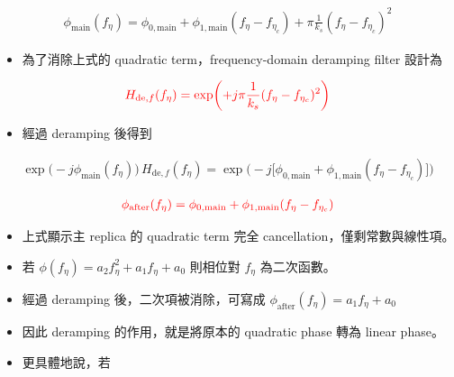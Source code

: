 \documentclass[10pt]{article}
\providecommand{\tightlist}{%
  \setlength{\itemsep}{0pt}\setlength{\parskip}{0pt}}
\begin{document}
\begin{equation}
\begin{aligned}
\phi_{\mathrm{main}}(f_\eta)=\phi_{0,\mathrm{main}}+\phi_{1,\mathrm{main}}(f_\eta-f_{\eta_c})+\pi\frac{1}{k_s}(f_\eta-f_{\eta_c})^2
\end{aligned}
\end{equation}

\begin{itemize}
\tightlist
\item
  為了消除上式的 quadratic term，frequency-domain deramping filter
  設計為
\end{itemize}

\begin{equation}
\begin{aligned}
{\color{red}{H_{\mathrm{de},f}(f_\eta)=\exp\biggl(+j\pi\frac{1}{k_s}(f_\eta-f_{\eta_c})^2\biggr)}}
\end{aligned}
\end{equation}

\begin{itemize}
\tightlist
\item
  經過 deramping 後得到
\end{itemize}

\begin{equation}
\begin{aligned}
\exp\biggl(-j\phi_{\mathrm{main}}(f_\eta)\biggr)\,H_{\mathrm{de},f}(f_\eta) =
\exp\biggl(-j\biggl[\phi_{0,\mathrm{main}}+\phi_{1,\mathrm{main}}(f_\eta-f_{\eta_c})\biggr]\biggr)
\end{aligned}
\end{equation}

\begin{equation}
\begin{aligned}
{\color{red}{\phi_{\mathrm{after}}(f_\eta)=\phi_{0,\mathrm{main}}+\phi_{1,\mathrm{main}}(f_\eta-f_{\eta_c})}}
\end{aligned}
\end{equation}

\begin{itemize}
\item
  上式顯示主 replica 的 quadratic term 完全
  cancellation，僅剩常數與線性項。
\item
  若 \(\phi(f_\eta)=a_2 f_\eta^2+a_1 f_\eta+a_0\) 則相位對 \(f_\eta\)
  為二次函數。
\item
  經過 deramping 後，二次項被消除，可寫成
  \(\phi_{\mathrm{after}}(f_\eta)=a_1 f_\eta+a_0\)
\item
  因此 deramping 的作用，就是將原本的 quadratic phase 轉為 linear
  phase。
\item
  更具體地說，若
\end{itemize}
\end{document}
